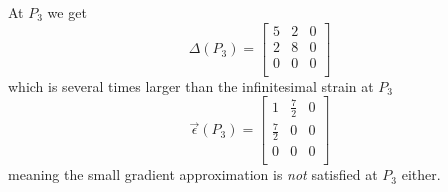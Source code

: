 \begin{derivation}
    At $P_3$ we get
    \begin{equation*}
      \Delta (P_3) = \begin{bmatrix}
        5 & 2 & 0\\
      2 & 8 & 0\\
      0 & 0 & 0\\
      \end{bmatrix}
    \end{equation*}
    which is several times larger than the infinitesimal strain at $P_3$
    \begin{equation*}
      \Vec{\epsilon}(P_3) = \begin{bmatrix}
        1 & \frac{7}{2} & 0\\
      \frac{7}{2} & 0 & 0\\
      0 & 0 & 0\\
      \end{bmatrix}
    \end{equation*}
    meaning the small gradient approximation is \textit{not} satisfied at $P_3$ either.
  \end{derivation}


